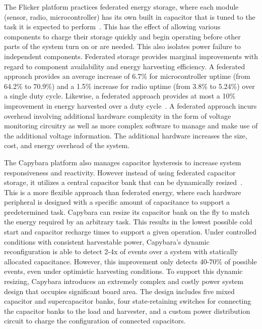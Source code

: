 The Flicker
platform practices federated energy storage, where each module (sensor, radio, microcontroller) has its own built in capacitor that is tuned to the task it is expected to perform~\cite{hesterFlicker17, hesterTragedy15}.
This has the
effect of allowing various components to charge their storage quickly and begin operating before other parts of the system turn on or are needed. This also
isolates power failure to independent components.
Federated storage provides marginal improvements with regard to component availability and energy harvesting efficiency. A federated approach provides an average increase of 6.7\% for microcontroller uptime (from 64.2\% to 70.9\%) and a 1.5\% increase for radio uptime (from 3.8\% to 5.24\%) over a single duty cycle. Likewise, a federated approach provides at most a 10\% improvement in energy harvested over a duty cycle~\cite{hesterTragedy15}.
A federated approach incurs overhead involving additional hardware complexity in the form of voltage monitoring circuitry as well as more complex software to manage and make use of the additional voltage information. The additional hardware increases the size, cost, and energy overhead of the system.

The Capybara platform also manages capacitor hysteresis to increase system responsiveness and reactivity. However instead of using federated capacitor storage, it utilizes a central capacitor bank that can be dynamically resized~\cite{colinReconfigurable18}.
This is a more flexible approach than federated energy, where each hardware peripheral is designed with a specific amount of capacitance to support a predetermined task.
Capybara can resize its capacitor bank on the fly to match the energy required by an arbitrary task. This results in the lowest possible cold start and capacitor recharge times to support a given operation.
Under controlled conditions with consistent harvestable power, Capybara's dynamic reconfiguration is able to detect 2-4x of events over a system with statically allocated capacitance. However, this improvement only detects 40-70\% of possible events, even under optimistic harvesting conditions.
To support this dynamic resizing, Capybara introduces an extremely complex and costly power system design that occupies significant board area. 
The design includes five mixed capacitor and supercapacitor banks, four state-retaining switches for connecting the capacitor banks to the load and harvester, and a custom power distribution circuit to charge the configuration of connected capacitors.


